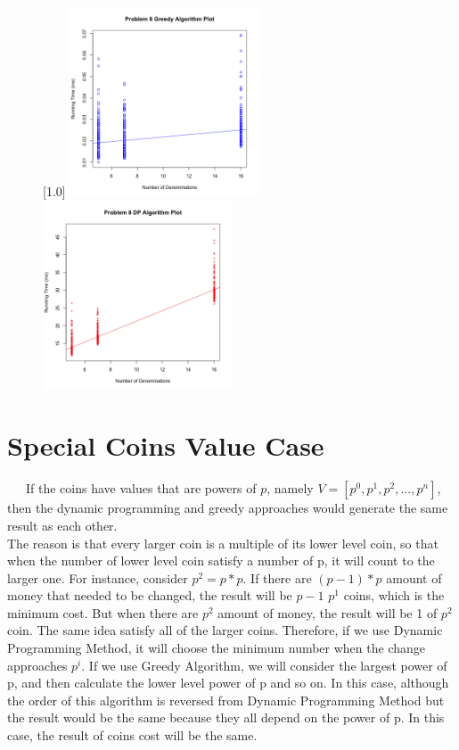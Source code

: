 \documentclass[11pt]{scrreprt}
\begin{document}
\begin{figure}[!htbp]
	\captionsetup{justification=centering,singlelinecheck=off}
	\captionsetup[subfigure]{singlelinecheck=on}
	[1.0\textwidth]
	{%
		\includegraphics[width=0.50\textwidth]{den1.png}%
		\includegraphics[width=0.50\textwidth]{den2.png}
	}%
\end{figure}

\section{Special Coins Value Case}

\ \ \ If the coins have values that are powers of $p$, namely $V = [p^0 , p^1 , p^2 , ... , p^n]$, then the dynamic programming and greedy approaches would generate the same result as each other.\\

The reason is that every larger coin is a multiple of its lower level coin, so that when the number of lower level coin satisfy a number of p, it will count to the larger one. For instance, consider $p^2 = p*p$. If there are $(p-1)*p$ amount of money that needed to be changed, the result will be $p-1$ $p^1$ coins, which is the minimum cost. But when there are $p^2$ amount of money, the result will be 1 of $p^2$ coin. The same idea satisfy all of the larger coins. Therefore, if we use Dynamic Programming Method, it will choose the minimum number when the change approaches $p^i$. If we use Greedy Algorithm, we will consider the largest power of p, and then calculate the lower level power of p and so on. In this case, although the order of this algorithm is reversed from Dynamic Programming Method but the result would be the same because they all depend on the power of p. In this case, the result of coins cost will be the same.
\end{document}

